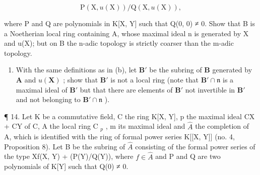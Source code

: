 \[
\mathrm{P} (\mathrm{X}, u (\mathrm{X})) / \mathrm{Q} (\mathrm{X}, u (\mathrm{X})),
\]

where P and Q are polynomials in K{[}X, Y{]} such that Q(0, 0) ≠ 0. Show that B is a Noetherian local ring containing A, whose maximal ideal n is generated by X and u(X); but on B the n-adic topology is strictly coarser than the m-adic topology.

\begin{enumerate}
\def\labelenumi{(\alph{enumi})}
\setcounter{enumi}{2}
\tightlist
\item
  With the same definitions as in (b), let \(\mathbf{B}'\) be the subring of \(\mathbf{B}\) generated by \(\mathbf{A}\) and \(u(\mathbf{X})\) ; show that \(\mathbf{B}'\) is not a local ring (note that \(\mathbf{B}' \cap \mathfrak{n}\) is a maximal ideal of \(\mathbf{B}'\) but that there are elements of \(\mathbf{B}'\) not invertible in \(\mathbf{B}'\) and not belonging to \(\mathbf{B}' \cap \mathfrak{n}\) ).
\end{enumerate}

¶ 14. Let K be a commutative field, C the ring K{[}X, Y{]}, p the maximal ideal CX + CY of C, A the local ring C \(_{p}\) , m its maximal ideal and \(\hat{A}\) the completion of A, which is identified with the ring of formal power series K{[}{[}X, Y{]}{]} (no. 4, Proposition 8). Let B be the subring of \(\hat{A}\) consisting of the formal power series of the type Xf(X, Y) + (P(Y)/Q(Y)), where \(f \in \hat{A}\) and P and Q are two polynomials of K{[}Y{]} such that Q(0) ≠ 0.

